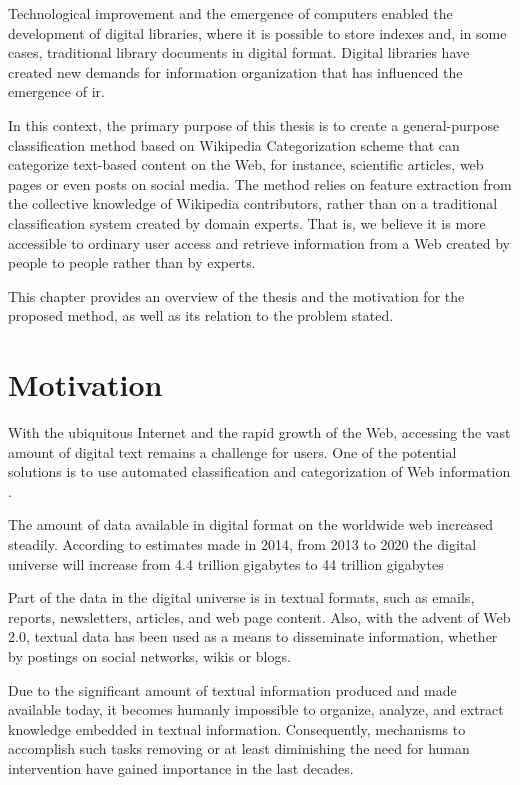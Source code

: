 Technological improvement and the emergence of computers enabled the development of digital libraries, where it is possible to store indexes and, in some cases, traditional library documents in digital format. Digital libraries have created new demands for information organization that has influenced the emergence of \gls{ir}.

In this context, the primary purpose of this thesis is to create a general-purpose classification method based on Wikipedia Categorization scheme that can categorize text-based content on the Web, for instance, scientific articles, web pages or even posts on social media. The method relies on feature extraction from the collective knowledge of Wikipedia contributors, rather than on a traditional classification system created by domain experts. That is, we believe it is more accessible to ordinary user access and retrieve information from a Web created by people to people rather than by experts.


This chapter provides an overview of the thesis and the motivation for the proposed method, as well as its relation to the problem stated. 

\section{\hspace*{3pt}Motivation}

With the ubiquitous Internet and the rapid growth of the Web, accessing the vast amount of digital text remains a challenge for users. One of the potential solutions is to use automated classification and categorization of Web information \cite{Gabrilovich:2005}.

The amount of data available in digital format on the worldwide web increased steadily. According to estimates made in 2014, from 2013 to 2020 the digital universe will increase from 4.4 trillion gigabytes to 44 trillion gigabytes ~\cite{turner2014digital}

Part of the data in the digital universe is in textual formats, such as emails, reports, newsletters, articles, and web page content. Also, with the advent of Web 2.0, textual data has been used as a means to disseminate information, whether by postings on social networks, wikis or blogs. ~\cite{fuchs2013internet} ~\cite{o2009web}

Due to the significant amount of textual information produced and made available today, it becomes humanly impossible to organize, analyze, and extract knowledge embedded in textual information. Consequently, mechanisms to accomplish such tasks removing or at least diminishing the need for human intervention have gained importance in the last decades. ~\cite{feldman2007text} ~\cite{berry2010text} ~\cite{aggarwal2012mining} 

